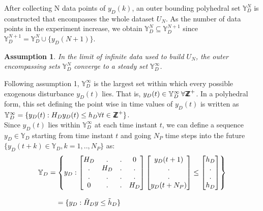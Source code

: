 \documentclass[letterpaper, 10 pt, conference]{ieeeconf}  %
\newcommand*{\ZZ}{%
	\textsf{Z\kern-1ex Z}%
}
\newtheorem{assumption}{Assumption}
\begin{document}
 After collecting N data points of $y_D(k)$, an outer bounding polyhedral set $\mathbb{Y}_D^N$ is constructed that encompasses the whole dataset $U_N$. As the number of data points in the experiment increase, we obtain $\mathbb{Y}_D^{N} \subseteq \mathbb{Y}_D^{N+1}$ since $\mathbb{Y}_D^{N+1} =  \mathbb{Y}_D^{N} \cup \{y_D(N+1)\}$.  
 \begin{assumption}
 	 In the limit of infinite data used to build $U_N$, the outer encompassing sets $\mathbb{Y}_D^{N}$ converge to a steady set $\mathbb{Y}_D^{\infty}$.
 \end{assumption} 
Following assumption 1, $\mathbb{Y}_D^{\infty}$ is the largest set within which every possible exogenous disturbance $y_D(t)$ lies. That is, $y_D(t) \in \mathbb{Y}_D^{\infty} \hspace{2pt}  \forall \ZZ^{+}$.  In a polyhedral form, this set defining the point wise in time values of $y_D(t)$ is written as $\mathbb{Y}_D^{\infty} = \{y_D(t):H_Dy_D(t) \leq h_D \forall t \in \ZZ^+\}$. \\
 Since $y_D(t)$ lies within $\mathbb{Y}_D^{\infty}$ at each time instant $t$, we can define a sequence $y_D \in \mathbb{Y}_D$ starting from time instant $t$ and going $N_P$ time steps into the future $\{y_D(t+k)\in\mathbb{Y}_D,k=1,..,N_P\}$ as:
 \begin{equation}
 \small
 \begin{matrix}
 \mathbb{Y}_D=\begin{Bmatrix}y_D:
 \begin{bmatrix}
 H_D & . & . & 0 \\
 . & H_D & . & .\\
 . & . & . & . \\
 0 & . & . & H_D
 \end{bmatrix}
 \begin{bmatrix}
 y_D(t+1) \\ . \\ . \\ y_D(t+N_P)
 \end{bmatrix}
 \leq \begin{bmatrix}
 h_D \\ . \\ . \\  h_D
 \end{bmatrix}
 \end{Bmatrix} 
 \\ \\
 \hspace{-120pt}
 = 
 \{ y_D: \tilde{H}_D y \leq \tilde{h}_D \}
 \end{matrix}
 \label{YD_set}
 \end{equation} 
\end{document}
